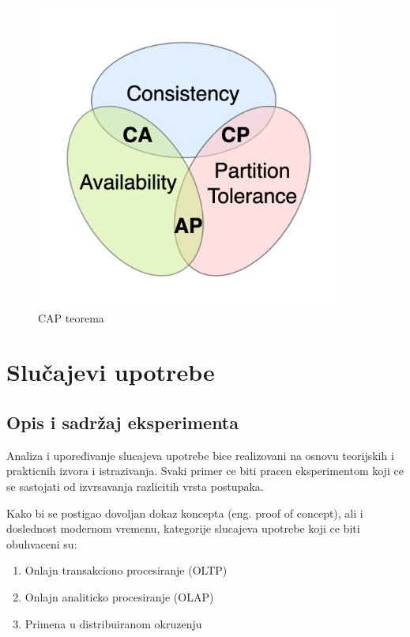 \documentclass[12pt,oneside]{memoir}
\begin{document}
\begin{figure}[!ht]
  \centering
  \includegraphics[width=0.9\textwidth]{cap.png}
  \caption{CAP teorema}
  \label{fig:grafikon}
\end{figure}

\chapter{Slučajevi upotrebe}
\section{Opis i sadržaj eksperimenta}
Analiza i upoređivanje slucajeva upotrebe bice realizovani na osnovu teorijskih i prakticnih  izvora i istrazivanja. Svaki primer ce biti pracen eksperimentom koji ce se sastojati od izvrsavanja razlicitih vrsta postupaka.

Kako bi se postigao dovoljan dokaz koncepta (eng. proof of concept), ali i doslednost modernom
vremenu, kategorije slucajeva upotrebe koji ce biti obuhvaceni su:
\begin{enumerate}
\item Onlajn transakciono procesiranje (OLTP)
\item Onlajn analiticko procesiranje (OLAP)
\item Primena u distribuiranom okruzenju
\end{enumerate}
\end{document}
